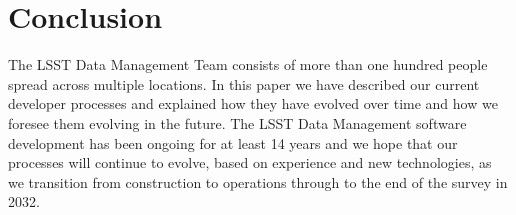 \section{Conclusion}

The LSST Data Management Team consists of more than one hundred people spread across multiple locations.
In this paper we have described our current developer processes and explained how they have evolved over time and how we foresee them evolving in the future.
The LSST Data Management software development has been ongoing for at least 14 years and we hope that our processes will continue to evolve, based on experience and new technologies, as we transition from construction to operations through to the end of the survey in 2032.
